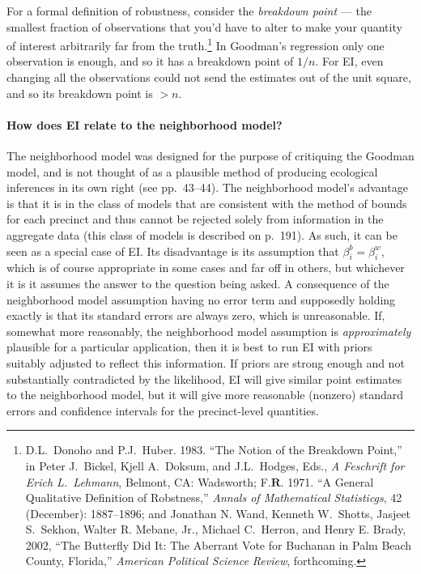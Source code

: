 \documentclass[11pt,titlepage]{article}
\newcommand{\R}{\ensuremath{\textbf{R}}}
\begin{document}
For a formal definition of robustness, consider the \emph{breakdown
  point} --- the smallest fraction of observations that you'd have to
alter to make your quantity of interest arbitrarily far from the
truth.\footnote{D.L.\ Donoho and P.J.\ Huber. 1983. ``The Notion of
  the Breakdown Point,'' in Peter J.\ Bickel, Kjell A.\ Doksum, and
  J.L.\ Hodges, Eds., \emph{A Feschrift for Erich L.\ Lehmann},
  Belmont, CA: Wadsworth; F.\R. 1971. ``A General Qualitative
  Definition of Robstness,'' \emph{Annals of Mathematical
    Statisticgs}, 42 (December): 1887--1896; and Jonathan N. Wand,
  Kenneth W.\ Shotts, Jasjeet S.\ Sekhon, Walter R. Mebane, Jr.,
  Michael C.\ Herron, and Henry E. Brady, 2002, ``The Butterfly Did
  It: The Aberrant Vote for Buchanan in Palm Beach County, Florida,''
  \emph{American Political Science Review}, forthcoming.}  In
Goodman's regression only one observation is enough, and so it has a
breakdown point of $1/n$.  For EI, even changing all the observations
could not send the estimates out of the unit square, and so its
breakdown point is $>n$.

\paragraph{How does EI relate to the neighborhood model?}
The neighborhood model was designed for the purpose of critiquing the
Goodman model, and is not thought of as a plausible method of
producing ecological inferences in its own right (see pp.\ 43--44).
The neighborhood model's advantage is that it is in the class of
models that are consistent with the method of bounds for each precinct
and thus cannot be rejected solely from information in the aggregate
data (this class of models is described on p.\ 191).  As such, it can
be seen as a special case of EI.  Its disadvantage is its assumption
that $\beta_i^b=\beta_i^w$, which is of course appropriate in some
cases and far off in others, but whichever it is it assumes the answer
to the question being asked.  A consequence of the neighborhood model
assumption having no error term and supposedly holding exactly is that
its standard errors are always zero, which is unreasonable.  If,
somewhat more reasonably, the neighborhood model assumption is
\emph{approximately} plausible for a particular application, then it
is best to run EI with priors suitably adjusted to reflect this
information.  If priors are strong enough and not substantially
contradicted by the likelihood, EI will give similar point estimates
to the neighborhood model, but it will give more reasonable (nonzero)
standard errors and confidence intervals for the precinct-level
quantities.
\end{document}
